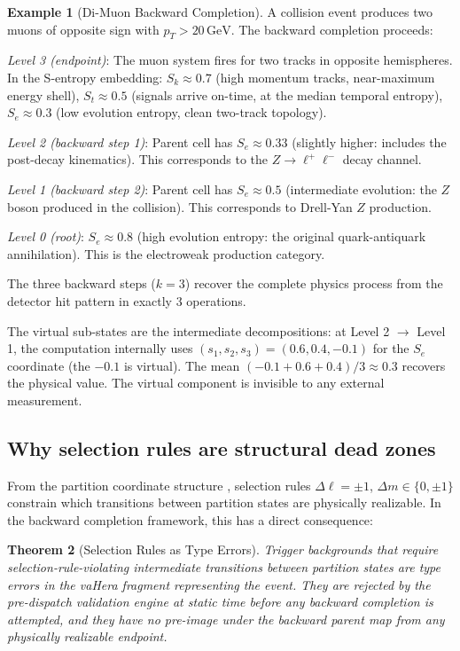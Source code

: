 \documentclass[twocolumn,10pt,a4paper]{article}
\theoremstyle{thmstyle}
\newtheorem{theorem}{Theorem}[section]
\theoremstyle{definition}
\newtheorem{example}[theorem]{Example}
\theoremstyle{remark}
\newcommand{\Sk}{S_{k}}
\newcommand{\St}{S_{t}}
\newcommand{\Se}{S_{e}}
\begin{document}
\begin{example}[Di-Muon Backward Completion]
\label{ex:dimuon}
A collision event produces two muons of opposite sign with $p_T > 20\,\mathrm{GeV}$.
The backward completion proceeds:

\emph{Level 3 (endpoint)}: The muon system fires for two tracks in opposite
hemispheres. In the S-entropy embedding:
$\Sk \approx 0.7$ (high momentum tracks, near-maximum energy shell),
$\St \approx 0.5$ (signals arrive on-time, at the median temporal entropy),
$\Se \approx 0.3$ (low evolution entropy, clean two-track topology).

\emph{Level 2 (backward step 1)}: Parent cell has $\Se \approx 0.33$
(slightly higher: includes the post-decay kinematics). This corresponds to
the $Z \to \ell^+\ell^-$ decay channel.

\emph{Level 1 (backward step 2)}: Parent cell has $\Se \approx 0.5$
(intermediate evolution: the $Z$ boson produced in the collision).
This corresponds to Drell-Yan $Z$ production.

\emph{Level 0 (root)}: $\Se \approx 0.8$ (high evolution entropy: the
original quark-antiquark annihilation). This is the electroweak production category.

The three backward steps ($k = 3$) recover the complete physics process
from the detector hit pattern in exactly 3 operations.

The virtual sub-states are the intermediate decompositions:
at Level 2 $\to$ Level 1, the computation internally uses
$(s_1, s_2, s_3) = (0.6, 0.4, -0.1)$ for the $\Se$ coordinate
(the $-0.1$ is virtual). The mean $(-0.1 + 0.6 + 0.4)/3 \approx 0.3$
recovers the physical value. The virtual component is invisible to any
external measurement.
\end{example}

\subsection{Why selection rules are structural dead zones}

From the partition coordinate structure \citep{companion:math}, selection
rules $\Delta\ell = \pm 1$, $\Delta m \in \{0,\pm 1\}$ constrain which
transitions between partition states are physically realizable. In the
backward completion framework, this has a direct consequence:

\begin{theorem}[Selection Rules as Type Errors]
\label{thm:selection_rules}
Trigger backgrounds that require selection-rule-violating intermediate
transitions between partition states are \emph{type errors} in the vaHera
fragment representing the event. They are rejected by the pre-dispatch
validation engine at static time before any backward completion is attempted,
and they have no pre-image under the backward parent map from any physically
realizable endpoint.
\end{theorem}
\end{document}
